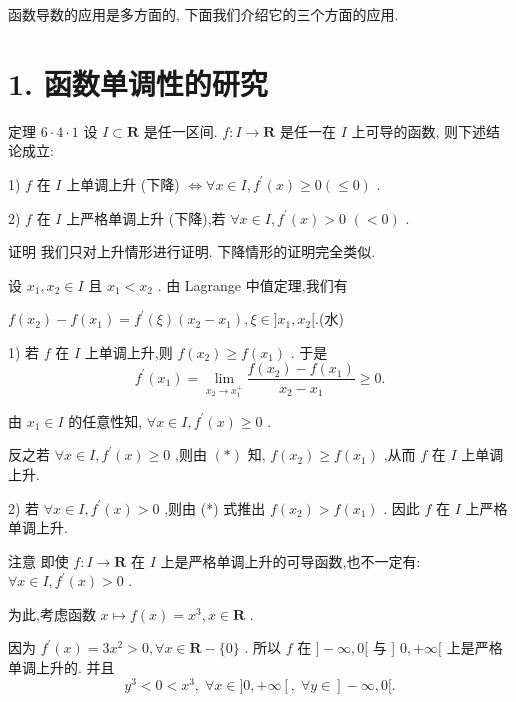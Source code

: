 函数导数的应用是多方面的, 下面我们介绍它的三个方面的应用.

\section*{1. 函数单调性的研究}

定理 $6 \cdot  4 \cdot  1$ 设 $I \subset  \mathbf{R}$ 是任一区间. $f : I \rightarrow  \mathbf{R}$ 是任一在 $I$ 上可导的函数, 则下述结论成立:

1) $f$ 在 $I$ 上单调上升 (下降) $\Leftrightarrow  \forall x \in  I,{f}^{\prime }\left( x\right)  \geq  0\left( { \leq  0}\right)$ .

2) $f$ 在 $I$ 上严格单调上升 (下降),若 $\forall x \in  I,{f}^{\prime }\left( x\right)  > 0$  $\left( { < 0}\right)$ .

证明 我们只对上升情形进行证明. 下降情形的证明完全类似.

设 ${x}_{1},{x}_{2} \in  I$ 且 ${x}_{1} < {x}_{2}$ . 由 Lagrange 中值定理,我们有

$f\left( {x}_{2}\right)  - f\left( {x}_{1}\right)  = {f}^{\prime }\left( \xi \right) \left( {{x}_{2} - {x}_{1}}\right) ,\xi  \in  \rbrack {x}_{1},{x}_{2}\lbrack .$(水)

1) 若 $f$ 在 $I$ 上单调上升,则 $f\left( {x}_{2}\right)  \geq  f\left( {x}_{1}\right)$ . 于是
$${f}^{\prime }\left( {x}_{1}\right)  = \mathop{\lim }\limits_{{{x}_{2} \rightarrow  {x}_{1}^{ + }}}\frac{f\left( {x}_{2}\right)  - f\left( {x}_{1}\right) }{{x}_{2} - {x}_{1}} \geq  0.$$

由 ${x}_{1} \in  I$ 的任意性知, $\forall x \in  I,{f}^{\prime }\left( x\right)  \geq  0$ .

反之若 $\forall x \in  I,{f}^{\prime }\left( x\right)  \geq  0$ ,则由 $\left( *\right)$ 知, $f\left( {x}_{2}\right)  \geq  f\left( {x}_{1}\right)$ ,从而 $f$ 在 $I$ 上单调上升.

2) 若 $\forall x \in  I,{f}^{\prime }\left( x\right)  > 0$ ,则由 (*) 式推出 $f\left( {x}_{2}\right)  > f\left( {x}_{1}\right)$ . 因此 $f$ 在 $I$ 上严格单调上升.

注意 即使 $f : I \rightarrow  \mathbf{R}$ 在 $I$ 上是严格单调上升的可导函数,也不一定有: $\forall x \in  I,{f}^{\prime }\left( x\right)  > 0$ .

为此,考虑函数 $x \mapsto  f\left( x\right)  = {x}^{3},x \in  \mathbf{R}$ .

因为 ${f}^{\prime }\left( x\right)  = 3{x}^{2} > 0,\forall x \in  \mathbf{R} - \{ 0\}$ . 所以 $f$ 在 $\rbrack  - \infty ,0\lbrack$ 与 ] $0, + \infty \lbrack$ 上是严格单调上升的. 并且
$${y}^{3} < 0 < {x}^{3},\;\forall x \in  \rbrack 0, + \infty \left\lbrack  {,\;\forall y \in  }\right\rbrack   - \infty ,0\lbrack .$$

